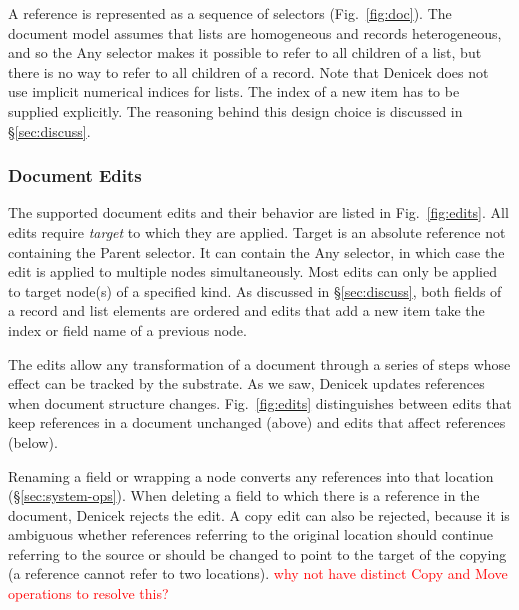 \documentclass[sigconf,anonymous,screen]{acmart}
\newcommand{\ident}[1]{{\sffamily #1}}
\newcommand{\note}[1]{\textcolor{red}{#1}}
\begin{document}
A reference is represented as a sequence of selectors (Fig.~\ref{fig:doc}).
The document model assumes that lists are homogeneous and records heterogeneous, and so the
\ident{Any} selector makes it possible to refer to all children of a list, but there is no
way to refer to all children of a record. Note that Denicek does not use implicit numerical
indices for lists. The index of a new item has to be supplied explicitly. The reasoning behind
this design choice is discussed in \S\ref{sec:discuss}.

\subsubsection*{Document Edits}
The supported document edits and their behavior are listed in Fig.~\ref{fig:edits}. All edits
require \emph{target} to which they are applied. Target is an absolute reference not containing the
\ident{Parent} selector. It can contain the \ident{Any} selector, in which case the edit is applied
to multiple nodes simultaneously. Most edits can only be applied to target node(s) of a specified
kind. As discussed in \S\ref{sec:discuss}, both fields of a record and list elements are ordered
and edits that add a new item take the index or field name of a previous node.

The edits allow any transformation of a document through a series of steps whose effect can be
tracked by the substrate. As we saw, Denicek updates references when document structure changes.
Fig.~\ref{fig:edits} distinguishes between edits that keep references in a document unchanged
(above) and edits that affect references (below).

Renaming a field or wrapping a node converts any references into that location
(\S\ref{sec:system-ops}). When deleting a field to which there is a reference in the document, Denicek
rejects the edit. A copy edit can also be rejected, because it is ambiguous whether references
referring to the original location should continue referring to the source or should be changed to
point to the target of the copying (a reference cannot refer to two locations).
\note{why not have distinct Copy and Move operations to resolve this?}


\end{document}
